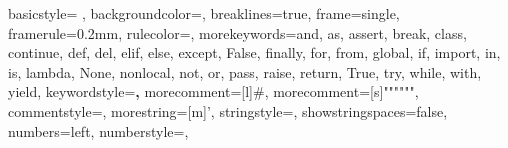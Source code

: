 {
    basicstyle= \ttfamily{}, %
    backgroundcolor=\color{background}, %
    breaklines=true, %
    frame=single,
    framerule=0.2mm, %
    rulecolor=\color{gray}, %
    morekeywords={and, as, assert, break, class, continue, def, del, elif, else, except, False, finally, for, from, global, if, import, in, is, lambda, None, nonlocal, not, or, pass, raise, return, True, try, while, with, yield},
    keywordstyle=\color{blue}\textbf,
    morecomment=[l]{\#},
    morecomment=[s]{"""}{"""},
    commentstyle=\color{comment},
    morestring=[m]', %
    stringstyle=\color{string},
    showstringspaces=false,
    numbers=left,
    numberstyle={\ttfamily{}\color{gray}}, %
}

\makeatletter 
  \renewcommand\verbatim@font{\normalfont\ttfamily\color{comment}}
\makeatother
